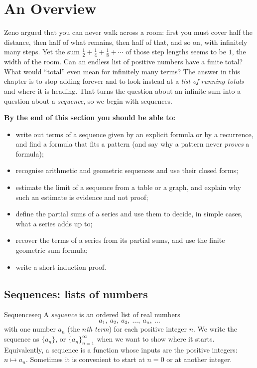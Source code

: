 \documentclass[11pt]{article}
\begin{document}
\section{An Overview}

\begin{guide}
Zeno argued that you can never walk across a room: first you must cover half the distance, then half of what remains, then half of that, and so on, with infinitely many steps. Yet the sum $\frac12+\frac14+\frac18+\cdots$ of those step lengths seems to be $1$, the width of the room. Can an endless list of positive numbers have a finite total? What would ``total'' even mean for infinitely many terms? The answer in this chapter is to stop adding forever and to look instead at a \emph{list of running totals} and where it is heading. That turns the question about an infinite sum into a question about a \emph{sequence}, so we begin with sequences.
\end{guide}

\textbf{By the end of this section you should be able to:}
\begin{itemize}
  \item write out terms of a sequence given by an explicit formula or by a recurrence, and find a formula that fits a pattern (and say why a pattern never \emph{proves} a formula);
  \item recognise arithmetic and geometric sequences and use their closed forms;
  \item estimate the limit of a sequence from a table or a graph, and explain why such an estimate is evidence and not proof;
  \item define the partial sums of a series and use them to decide, in simple cases, what a series adds up to;
  \item recover the terms of a series from its partial sums, and use the finite geometric sum formula;
  \item write a short induction proof.
\end{itemize}

\subsection*{Sequences: lists of numbers}

\begin{defn}{Sequence}{seq}
A \emph{sequence} is an ordered list of real numbers
\[
a_1,\ a_2,\ a_3,\ \dots,\ a_n,\ \dots
\]
with one number $a_n$ (the \emph{$n$th term}) for each positive integer $n$. We write the sequence as $\{a_n\}$, or $\{a_n\}_{n=1}^{\infty}$ when we want to show where it starts. Equivalently, a sequence is a function whose inputs are the positive integers: $n\mapsto a_n$. Sometimes it is convenient to start at $n=0$ or at another integer.
\end{defn}
\end{document}
